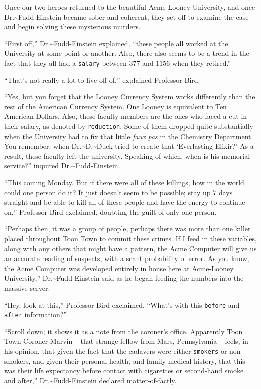 \documentclass[captions=tableheading]{scrbook}
\begin{document}
Once our two heroes returned to the beautiful Acme-Looney University, and once Dr.\~{}Fudd-Einstein became sober and coherent, they set off to examine the case and begin solving these mysterious murders.

“First off,” Dr.\~{}Fudd-Einstein explained, “these people all worked at the University at some point or another. Also, there also seems to be a trend in the fact that they all had a \texttt{salary} between \(  377 \) and \(  1156 \) when they retired.” 

“That’s not really a lot to live off of,” explained Professor Bird. 

“Yes, but you forget that the Looney Currency System works differently than the rest of the American Currency System. One Looney is equivalent to Ten American Dollars. Also, these faculty members are the ones who faced a cut in their salary, as denoted by \texttt{reduction}. Some of them dropped quite substantially when the University had to fix that little \emph{faux pas} in the Chemistry Department. You remember: when Dr.\~{}D.\~{}Duck tried to create that ‘Everlasting Elixir?’ As a result, these faculty left the university. Speaking of which, when is his memorial service?” inquired Dr.\~{}Fudd-Einstein. 

“This coming Monday. But if there were all of these killings, how in the world could one person do it? It just doesn’t seem to be possible; stay up \(  7 \) days straight and be able to kill all of these people and have the energy to continue on,” Professor Bird exclaimed, doubting the guilt of only one person. 

“Perhaps then, it was a group of people, perhaps there was more than one killer placed throughout Toon Town to commit these crimes. If I feed in these variables, along with any others that might have a pattern, the Acme Computer will give us an accurate reading of suspects, with a scant probability of error. As you know, the Acme Computer was developed entirely in house here at Acme-Looney University,” Dr.\~{}Fudd-Einstein said as he began feeding the numbers into the massive server. 

“Hey, look at this,” Professor Bird exclaimed, “What’s with this \texttt{before} and \texttt{after} information?” 

“Scroll down; it shows it as a note from the coroner’s office. Apparently Toon Town Coroner Marvin -- that strange fellow from Mars, Pennsylvania -- feels, in his opinion, that given the fact that the cadavers were either \texttt{smokers} or non-smokers, and given their personal health, and family medical history, that this was their life expectancy before contact with cigarettes or second-hand smoke and after,” Dr.\~{}Fudd-Einstein declared matter-of-factly. 
\end{document}
